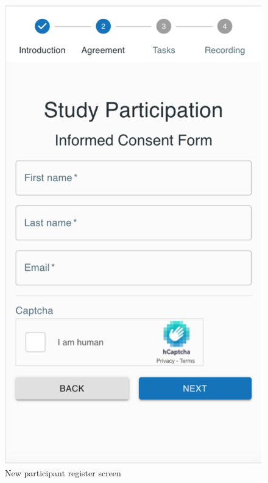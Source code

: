 \begin{minipage}{.5\textwidth}
\begin{figure}[H]
    \centering
    \includegraphics[width=\textwidth]{appendix/imgs/web-register.png}
    \caption{New participant register screen}
    \label{fig:web-register}
\end{figure}
\end{minipage}

